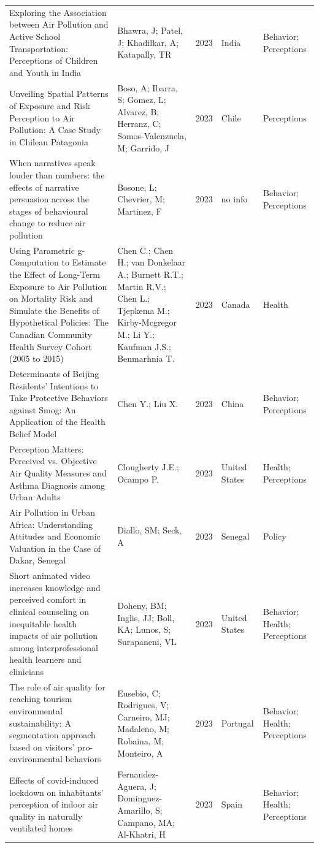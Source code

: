 {\begin{longtable}[t]{p{6cm}p{3cm}lp{3cm}p{3cm}}
Exploring the Association between Air Pollution and Active School Transportation: Perceptions of Children and Youth in India & Bhawra, J; Patel, J; Khadilkar, A; Katapally, TR & 2023 & India & Behavior; Perceptions\\
Unveiling Spatial Patterns of Exposure and Risk Perception to Air Pollution: A Case Study in Chilean Patagonia & Boso, A; Ibarra, S; Gomez, L; Alvarez, B; Herranz, C; Somos-Valenzuela, M; Garrido, J & 2023 & Chile & Perceptions\\
When narratives speak louder than numbers: the effects of narrative persuasion across the stages of behavioural change to reduce air pollution & Bosone, L; Chevrier, M; Martinez, F & 2023 & no info & Behavior; Perceptions\\
\addlinespace
Using Parametric g-Computation to Estimate the Effect of Long-Term Exposure to Air Pollution on Mortality Risk and Simulate the Benefits of Hypothetical Policies: The Canadian Community Health Survey Cohort (2005 to 2015) & Chen C.; Chen H.; van Donkelaar A.; Burnett R.T.; Martin R.V.; Chen L.; Tjepkema M.; Kirby-Mcgregor M.; Li Y.; Kaufman J.S.; Benmarhnia T. & 2023 & Canada & Health\\
Determinants of Beijing Residents' Intentions to Take Protective Behaviors against Smog: An Application of the Health Belief Model & Chen Y.; Liu X. & 2023 & China & Behavior; Perceptions\\
Perception Matters: Perceived vs. Objective Air Quality Measures and Asthma Diagnosis among Urban Adults & Clougherty J.E.; Ocampo P. & 2023 & United States & Health; Perceptions\\
Air Pollution in Urban Africa: Understanding Attitudes and Economic Valuation in the Case of Dakar, Senegal & Diallo, SM; Seck, A & 2023 & Senegal & Policy\\
Short animated video increases knowledge and perceived comfort in clinical counseling on inequitable health impacts of air pollution among interprofessional health learners and clinicians & Doheny, BM; Inglis, JJ; Boll, KA; Lunos, S; Surapaneni, VL & 2023 & United States & Behavior; Health; Perceptions\\
\addlinespace
The role of air quality for reaching tourism environmental sustainability: A segmentation approach based on visitors' pro-environmental behaviors & Eusebio, C; Rodrigues, V; Carneiro, MJ; Madaleno, M; Robaina, M; Monteiro, A & 2023 & Portugal & Behavior; Health; Perceptions\\
Effects of covid-induced lockdown on inhabitants' perception of indoor air quality in naturally ventilated homes & Fernandez-Aguera, J; Dominguez-Amarillo, S; Campano, MA; Al-Khatri, H & 2023 & Spain & Behavior; Health; Perceptions\\

\end{longtable}}
